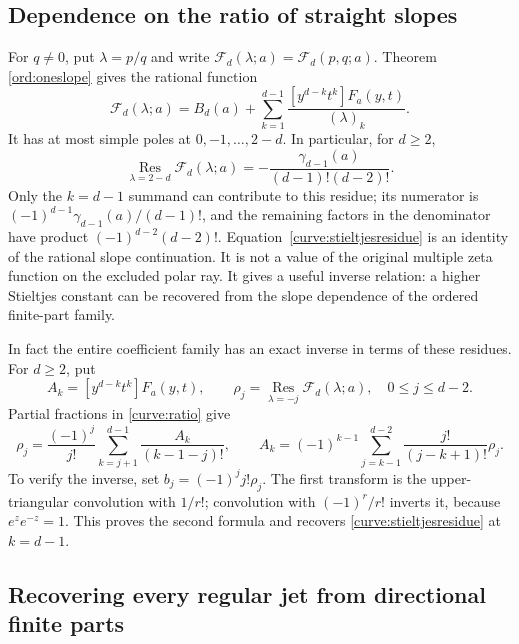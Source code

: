 \subsection{Dependence on the ratio of straight slopes}

For $q\ne0$, put $\lambda=p/q$ and write
$\mathcal F_d(\lambda;a)=\mathcal F_d(p,q;a)$. Theorem
\ref{ord:oneslope} gives the rational function
\begin{equation}\label{curve:ratio}
 \mathcal F_d(\lambda;a)=B_d(a)+
  \sum_{k=1}^{d-1}\frac{[y^{d-k}t^k]F_a(y,t)}{(\lambda)_k}.
\end{equation}
It has at most simple poles at $0,-1,\ldots,2-d$. In particular,
for $d\ge2$,
\begin{equation}\label{curve:stieltjesresidue}
 \boxed{\displaystyle
 \operatorname*{Res}_{\lambda=2-d}\mathcal F_d(\lambda;a)
 =-\frac{\gamma_{d-1}(a)}{(d-1)!(d-2)!}.}
\end{equation}
Only the $k=d-1$ summand can contribute to this residue; its numerator
is $(-1)^{d-1}\gamma_{d-1}(a)/(d-1)!$, and the remaining factors in
the denominator have product $(-1)^{d-2}(d-2)!$.
Equation~\eqref{curve:stieltjesresidue} is an identity of the rational
slope continuation. It is not a value of the original multiple zeta
function on the excluded polar ray. It gives a useful inverse
relation: a higher Stieltjes constant can be recovered from the
slope dependence of the ordered finite-part family.

In fact the entire coefficient family has an exact inverse in terms
of these residues. For $d\ge2$, put
\[
 A_k=[y^{d-k}t^k]F_a(y,t),\qquad
 \rho_j=\operatorname*{Res}_{\lambda=-j}\mathcal F_d(\lambda;a),
 \quad 0\le j\le d-2.
\]
Partial fractions in \eqref{curve:ratio} give
\begin{equation}\label{curve:residuetransform}
 \rho_j=\frac{(-1)^j}{j!}
          \sum_{k=j+1}^{d-1}\frac{A_k}{(k-1-j)!},\qquad
 \boxed{A_k=(-1)^{k-1}\sum_{j=k-1}^{d-2}
                   \frac{j!}{(j-k+1)!}\rho_j.}
\end{equation}
To verify the inverse, set $b_j=(-1)^j j!\rho_j$. The first transform
is the upper-triangular convolution with $1/r!$; convolution with
$(-1)^r/r!$ inverts it, because $e^z e^{-z}=1$. This proves the second
formula and recovers \eqref{curve:stieltjesresidue} at $k=d-1$.

\subsection{Recovering every regular jet from directional finite parts}

